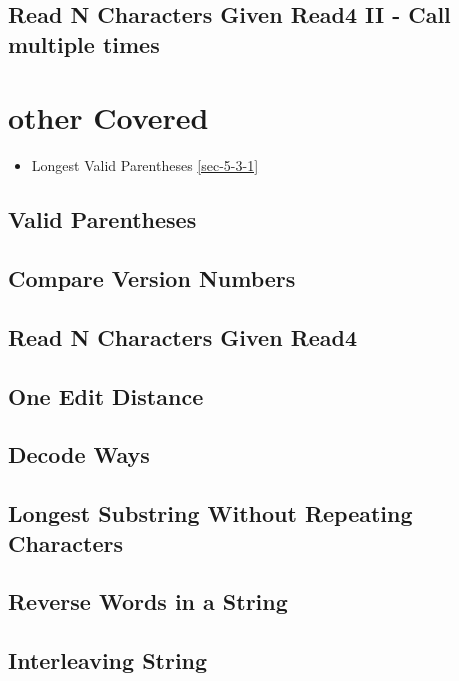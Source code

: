 \documentclass[12pt]{book}
\begin{document}
\subsection{Read N Characters Given Read4 II - Call multiple times}
\label{sec-2-3-5}
\section{other Covered}
\label{sec-2-4}
\begin{itemize}
\item Longest Valid Parentheses
\ref{sec-5-3-1}
\end{itemize}
\subsection{Valid Parentheses}
\label{sec-2-4-1}
\subsection{Compare Version Numbers}
\label{sec-2-4-2}
\subsection{Read N Characters Given Read4}
\label{sec-2-4-3}
\subsection{One Edit Distance}
\label{sec-2-4-4}
\subsection{Decode Ways}
\label{sec-2-4-5}
\subsection{Longest Substring Without Repeating Characters}
\label{sec-2-4-6}
\subsection{Reverse Words in a String}
\label{sec-2-4-7}
\subsection{Interleaving String}
\label{sec-2-4-8}
\end{document}
